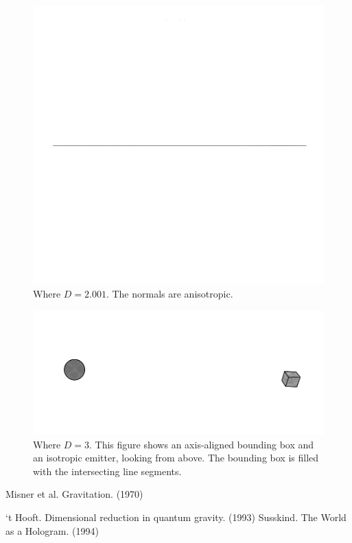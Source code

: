 \documentclass[12pt]{article}
\begin{document}
\begin{figure} 
\centering
\label{fig3}
  \includegraphics[width = 3 in]{2.001.png}
  \caption{
Where $D = 2.001$.
The normals are anisotropic.
}
\end{figure}


\begin{figure} 
\centering
\label{fig4}
  \includegraphics[width = 5 in]{AABB.png}
  \caption{
Where $D = 3$.
This figure shows an axis-aligned bounding box and an isotropic emitter, looking from above.
The bounding box is filled with the intersecting line segments.
}
\end{figure}












\begin{thebibliography}{9}

 Misner et al. Gravitation. (1970)

 `t Hooft. Dimensional reduction in quantum gravity. (1993)
 Susskind. The World as a Hologram. (1994)








\end{thebibliography}
\end{document}
